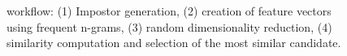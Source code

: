 \begin{figure}[htbp]
    \centering
    
    \caption{\impAppr{} workflow: (1) Impostor generation, (2) creation of feature vectors using frequent n-grams, (3) random dimensionality reduction, (4) similarity computation and selection of the most similar candidate.}
    \label{fig:impostor}
\end{figure}









